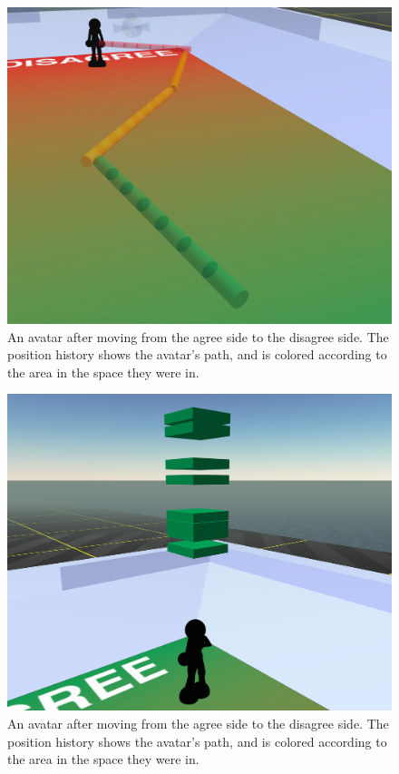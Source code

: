 \begin{figure}[tp]
	\includegraphics{figures/traces-lower.png}
	\caption{An avatar after moving from the agree side to the disagree side. The position history shows the avatar's path, and is colored according to the area in the space they were in.}
	\label{fig:information_space_traces}
\end{figure}

\begin{figure}[tp]
	\includegraphics{figures/chat-history-lower.png}
	\caption{An avatar after moving from the agree side to the disagree side. The position history shows the avatar's path, and is colored according to the area in the space they were in.}
	\label{fig:information_space_chat}
\end{figure}

